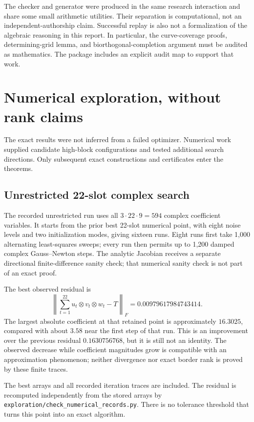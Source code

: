 \documentclass[11pt]{article}
\theoremstyle{definition}\newtheorem{definition}[theorem]{Definition}
\newcommand{\file}[1]{\nolinkurl{#1}}
\begin{document}
The checker and generator were produced in the same research interaction and share some small arithmetic utilities. Their separation is computational, not an independent-authorship claim. Successful replay is also not a formalization of the algebraic reasoning in this report. In particular, the curve-coverage proofs, determining-grid lemma, and biorthogonal-completion argument must be audited as mathematics. The package includes an explicit audit map to support that work.

\section{Numerical exploration, without rank claims}\label{sec:numeric}
The exact results were not inferred from a failed optimizer. Numerical work supplied candidate high-block configurations and tested additional search directions. Only subsequent exact constructions and certificates enter the theorems.

\subsection{Unrestricted 22-slot complex search}
The recorded unrestricted run uses all $3\cdot22\cdot9=594$ complex coefficient variables. It starts from the prior best 22-slot numerical point, with eight noise levels and two initialization modes, giving sixteen runs. Eight runs first take 1,000 alternating least-squares sweeps; every run then permits up to 1,200 damped complex Gauss--Newton steps. The analytic Jacobian receives a separate directional finite-difference sanity check; that numerical sanity check is not part of an exact proof.

The best observed residual is
\[
\left\|\sum_{t=1}^{22}u_t\otimes v_t\otimes w_t-T\right\|_F
=0.00979617984743414.
\]
The largest absolute coefficient at that retained point is approximately $16.3025$, compared with about $3.58$ near the first step of that run. This is an improvement over the previous residual $0.1630756768$, but it is still not an identity. The observed decrease while coefficient magnitudes grow is compatible with an approximation phenomenon; neither divergence nor exact border rank is proved by these finite traces.

The best arrays and all recorded iteration traces are included. The residual is recomputed independently from the stored arrays by \file{exploration/check_numerical_records.py}. There is no tolerance threshold that turns this point into an exact algorithm.
\end{document}
